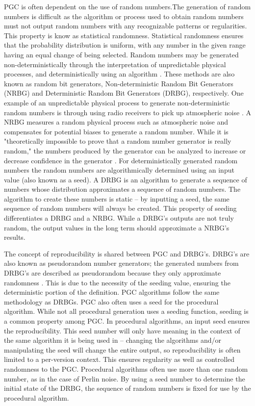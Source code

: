 \documentclass[10pt]{report}
\begin{document}
			PGC is often dependent on the use of random numbers.The generation of random numbers is difficult as the algorithm or process used to obtain random numbers must not output random numbers with any recognizable patterns or regularities. This property is know as statistical randomness. Statistical randomness ensures that the probability distribution is uniform, with any number in the given range having an equal change of being selected. Random numbers may be generated non-deterministically through the interpretation of unpredictable physical processes, and deterministically using an algorithm \cite{rng}. These methods are also known as random bit generators, Non-deterministic Random Bit Generators (NRBG) and Deterministic Random Bit Generators (DRBG), respectively. One example of an unpredictable physical process to generate non-deterministic random numbers is through using radio receivers to pick up atmospheric noise \cite{random-org}. A NRBG measures a random physical process such as atmospheric noise and compensates for potential biases to generate a random number. While it is "theoretically impossible to prove that a random number generator is really random," the numbers produced by the generator can be analyzed to increase or decrease confidence in the generator \cite{random-org}. For deterministically generated random numbers the random numbers are algorithmically determined using an input value (also known as a seed). A DRBG is an algorithm to generate a sequence of numbers whose distribution approximates a sequence of random numbers. The algorithm to create these numbers is static -- by inputting a seed, the same sequence of random numbers will always be created. This property of seeding differentiates a DRBG and a NRBG. While a DRBG's outputs are not truly random, the output values in the long term should approximate a NRBG's results. 
			
			The concept of reproducibility is shared between PGC and DRBG's. DRBG's are also known as pseudorandom number generators; the generated numbers from DRBG's are described as pseudorandom because they only approximate randomness \cite{rng}. This is due to the necessity of the seeding value, ensuring the deterministic portion of the definition. PGC algorithms follow the same methodology as DRBGs. PGC also often uses a seed for the procedural algorithm. While not all procedural generation uses a seeding function, seeding is a common property among PGC. In procedural algorithms, an input seed ensures the reproducibility. This seed number will only have meaning in the context of the same algorithm it is being used in -- changing the algorithms and/or manipulating the seed will change the entire output, so reproducibility is often limited to a per-version context. This ensures regularity as well as controlled randomness to the PGC. Procedural algorithms often use more than one random number, as in the case of Perlin noise. By using a seed number to determine the initial state of the DRBG, the sequence of random numbers is fixed for use by the procedural algorithm. 
			
\end{document}
